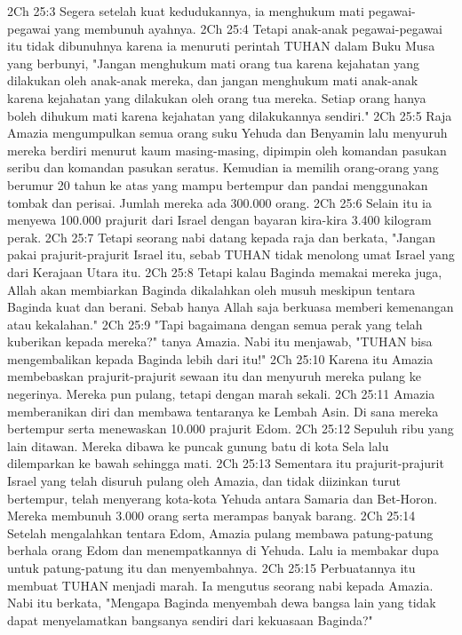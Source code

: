 2Ch 25:3  Segera setelah kuat kedudukannya, ia menghukum mati pegawai-pegawai yang membunuh ayahnya.
2Ch 25:4  Tetapi anak-anak pegawai-pegawai itu tidak dibunuhnya karena ia menuruti perintah TUHAN dalam Buku Musa yang berbunyi, "Jangan menghukum mati orang tua karena kejahatan yang dilakukan oleh anak-anak mereka, dan jangan menghukum mati anak-anak karena kejahatan yang dilakukan oleh orang tua mereka. Setiap orang hanya boleh dihukum mati karena kejahatan yang dilakukannya sendiri."
2Ch 25:5  Raja Amazia mengumpulkan semua orang suku Yehuda dan Benyamin lalu menyuruh mereka berdiri menurut kaum masing-masing, dipimpin oleh komandan pasukan seribu dan komandan pasukan seratus. Kemudian ia memilih orang-orang yang berumur 20 tahun ke atas yang mampu bertempur dan pandai menggunakan tombak dan perisai. Jumlah mereka ada 300.000 orang.
2Ch 25:6  Selain itu ia menyewa 100.000 prajurit dari Israel dengan bayaran kira-kira 3.400 kilogram perak.
2Ch 25:7  Tetapi seorang nabi datang kepada raja dan berkata, "Jangan pakai prajurit-prajurit Israel itu, sebab TUHAN tidak menolong umat Israel yang dari Kerajaan Utara itu.
2Ch 25:8  Tetapi kalau Baginda memakai mereka juga, Allah akan membiarkan Baginda dikalahkan oleh musuh meskipun tentara Baginda kuat dan berani. Sebab hanya Allah saja berkuasa memberi kemenangan atau kekalahan."
2Ch 25:9  "Tapi bagaimana dengan semua perak yang telah kuberikan kepada mereka?" tanya Amazia. Nabi itu menjawab, "TUHAN bisa mengembalikan kepada Baginda lebih dari itu!"
2Ch 25:10  Karena itu Amazia membebaskan prajurit-prajurit sewaan itu dan menyuruh mereka pulang ke negerinya. Mereka pun pulang, tetapi dengan marah sekali.
2Ch 25:11  Amazia memberanikan diri dan membawa tentaranya ke Lembah Asin. Di sana mereka bertempur serta menewaskan 10.000 prajurit Edom.
2Ch 25:12  Sepuluh ribu yang lain ditawan. Mereka dibawa ke puncak gunung batu di kota Sela lalu dilemparkan ke bawah sehingga mati.
2Ch 25:13  Sementara itu prajurit-prajurit Israel yang telah disuruh pulang oleh Amazia, dan tidak diizinkan turut bertempur, telah menyerang kota-kota Yehuda antara Samaria dan Bet-Horon. Mereka membunuh 3.000 orang serta merampas banyak barang.
2Ch 25:14  Setelah mengalahkan tentara Edom, Amazia pulang membawa patung-patung berhala orang Edom dan menempatkannya di Yehuda. Lalu ia membakar dupa untuk patung-patung itu dan menyembahnya.
2Ch 25:15  Perbuatannya itu membuat TUHAN menjadi marah. Ia mengutus seorang nabi kepada Amazia. Nabi itu berkata, "Mengapa Baginda menyembah dewa bangsa lain yang tidak dapat menyelamatkan bangsanya sendiri dari kekuasaan Baginda?"
